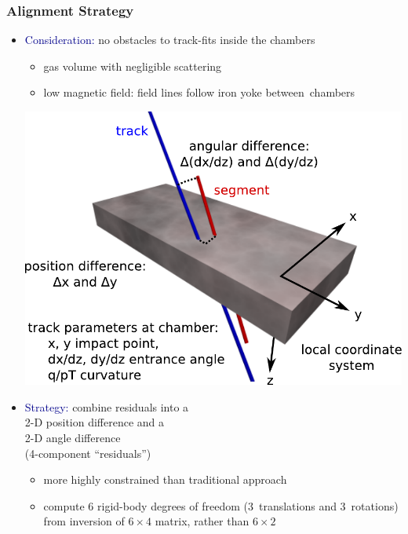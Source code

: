 \documentclass[compress]{beamer}
\begin{document}
\begin{frame}
\frametitle{Alignment Strategy}

\begin{itemize}
\item \textcolor{darkblue}{Consideration:} no obstacles to track-fits inside the chambers
\begin{itemize}
\item gas volume with negligible scattering
\item low magnetic field: field lines follow iron yoke \mbox{between chambers\hspace{-1 cm}}
\end{itemize}

\hfill \includegraphics[width=0.6\linewidth]{dt_coordinates.pdf}
\vspace{-4.25 cm}

\item \textcolor{darkblue}{Strategy:} combine residuals into a \\ 2-D
  position difference and a \\ 2-D angle difference \\ (4-component ``residuals'')

\vspace{2.8 cm}
\begin{itemize}
\item more highly constrained than traditional approach
\item compute 6 rigid-body degrees of freedom (3~translations and
3~rotations) from inversion of $6\times 4$ matrix, rather than $6\times 2$
\end{itemize}
\end{itemize}
\end{frame}
\end{document}
